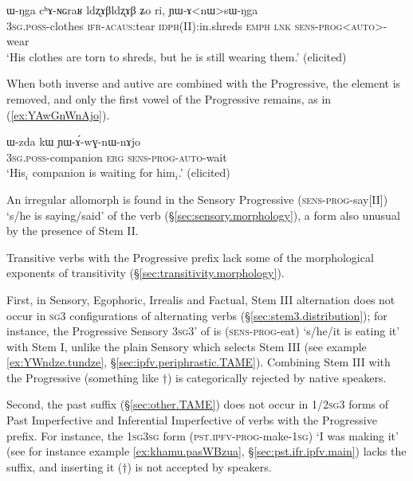 \begin{exe}
\ex \label{ex:YAnWsWNga}
\gll ɯ-ŋga cʰɤ-ɴɢraʁ ldʐɤβldʐɤβ ʑo ri, ɲɯ-ɤ<nɯ>sɯ-ŋga \\
\textsc{3sg}.\textsc{poss}-clothes \textsc{ifr}-\textsc{acaus}:tear \textsc{idph}(II):in.shreds \textsc{emph} \textsc{lnk} \textsc{sens}-\textsc{prog}<\textsc{auto}>-wear \\
\glt `His clothes are torn to shreds, but he is still wearing them.' (elicited)
\end{exe}

When both inverse and autive are combined with the Progressive, the  element is removed, and only the first vowel of the Progressive remains, as in (\ref{ex:YAwGnWnAjo}).

\begin{exe}
\ex \label{ex:YAwGnWnAjo}
\gll ɯ-zda kɯ ɲɯ-ɤ́-wɣ-nɯ-nɤjo \\
\textsc{3sg}.\textsc{poss}-companion \textsc{erg} \textsc{sens}-\textsc{prog}-\textsc{auto}-wait \\
\glt `His$_i$ companion is waiting for him$_i$.' (elicited)
\end{exe} 

An irregular allomorph  is found in the Sensory Progressive  (\textsc{sens}-\textsc{prog}-say[II])  `s/he is saying/said' of the verb   (§\ref{sec:sensory.morphology}), a form also unusual by the presence of Stem II.

Transitive verbs with the Progressive prefix lack some of the morphological exponents of transitivity (§\ref{sec:transitivity.morphology}). 

First, in Sensory, Egophoric, Irrealis and Factual, Stem III alternation does not occur in \textsc{sg}\fl{}3 configurations of alternating verbs (§\ref{sec:stem3.distribution}); for instance, the Progressive Sensory \textsc{3sg}\fl{}3' of  is  (\textsc{sens}-\textsc{prog}-eat) `s/he/it is eating it' with Stem I, unlike the plain Sensory  which selects Stem III (see example \ref{ex:YWndze.tundze}, §\ref{sec:ipfv.periphrastic.TAME}). Combining Stem III with the Progressive (something like $\dagger$) is categorically rejected by native speakers. 

Second, the past  suffix (§\ref{sec:other.TAME}) does not occur in 1/2\textsc{sg}\fl{}3 forms of Past Imperfective and Inferential Imperfective of verbs with the Progressive prefix. For instance, the \textsc{1sg}\fl{}\textsc{3sg} form  (\textsc{pst}.\textsc{ipfv}-\textsc{prog}-make-\textsc{1sg}) `I was making it' (see for instance example \ref{ex:khamu.pasWBzua}, §\ref{sec:pst.ifr.ipfv.main}) lacks the  suffix, and inserting it ($\dagger$) is not accepted by speakers. 

